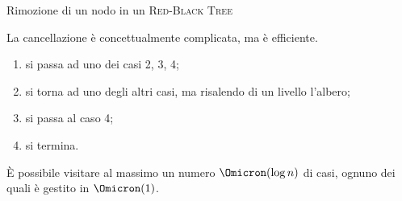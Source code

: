 \vspace{-5pt}
\begin{algorithm}[H]
	\caption{Rimozione di un nodo in un \textsc{Red-Black Tree}}
	\setcounter{AlgoLine}{0}
	
\end{algorithm}
\vspace{-10pt}

La cancellazione è concettualmente complicata, ma è efficiente.
\begin{enumerate}[label={\footnotesize\ttfamily (\arabic*)}, noitemsep, topsep = 5pt, parsep = 5pt, partopsep = 0pt]
	\item si passa ad uno dei casi 2, 3, 4;
	\item si torna ad uno degli altri casi, ma risalendo di un livello l'albero;
	\item si passa al caso 4;
	\item si termina.
\end{enumerate}

\`{E} possibile visitare al massimo un numero \(\Omicron(\log n)\) di casi, ognuno dei quali è gestito in \(\Omicron(1)\).

\ifsubfile

\fi
